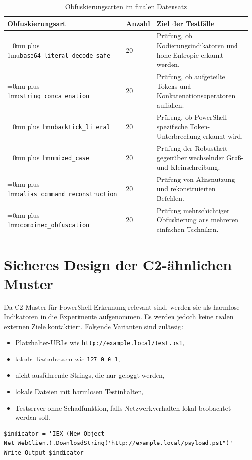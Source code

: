 \documentclass[12pt,a4paper,oneside,parskip=half]{scrreprt}
\newcommand{\codecell}[1]{\begingroup\Urlmuskip=0mu plus 1mu\relax\nolinkurl{#1}\endgroup}
\newcommand{\codebreak}[2]{\codecell{#1#2}}
\begin{document}
\begin{table}[H]
\centering
\caption{Obfuskierungsarten im finalen Datensatz}
\small
\begin{tabularx}{\textwidth}{|L{4cm}|C{1.5cm}|Y|}
\hline
\textbf{Obfuskierungsart} & \textbf{Anzahl} & \textbf{Ziel der Testfälle}\\
\hline
\codebreak{base64\_literal}{\_decode\_safe} & 20 & Prüfung, ob Kodierungsindikatoren und hohe Entropie erkannt werden.\\
\hline
\codebreak{string}{\_concatenation} & 20 & Prüfung, ob aufgeteilte Tokens und Konkatenationsoperatoren auffallen.\\
\hline
\codebreak{backtick}{\_literal} & 20 & Prüfung, ob PowerShell-spezifische Token-Unterbrechung erkannt wird.\\
\hline
\codebreak{mixed}{\_case} & 20 & Prüfung der Robustheit gegenüber wechselnder Groß- und Kleinschreibung.\\
\hline
\codebreak{alias\_command}{\_reconstruction} & 20 & Prüfung von Aliasnutzung und rekonstruierten Befehlen.\\
\hline
\codebreak{combined}{\_obfuscation} & 20 & Prüfung mehrschichtiger Obfuskierung aus mehreren einfachen Techniken.\\
\hline
\end{tabularx}
\end{table}

\section{Sicheres Design der C2-ähnlichen Muster}
Da C2-Muster für PowerShell-Erkennung relevant sind, werden sie als harmlose Indikatoren in die Experimente aufgenommen. Es werden jedoch keine realen externen Ziele kontaktiert. Folgende Varianten sind zulässig:
\begin{itemize}
    \item Platzhalter-URLs wie \texttt{http://example.local/test.ps1},
    \item lokale Testadressen wie \texttt{127.0.0.1},
    \item nicht ausführende Strings, die nur geloggt werden,
    \item lokale Dateien mit harmlosen Testinhalten,
    \item Testserver ohne Schadfunktion, falls Netzwerkverhalten lokal beobachtet werden soll.
\end{itemize}

\begin{lstlisting}[language={},caption={Harmloses Beispiel eines C2-ähnlichen Strings ohne Ausführung}]
$indicator = 'IEX (New-Object Net.WebClient).DownloadString("http://example.local/payload.ps1")'
Write-Output $indicator
\end{lstlisting}
\end{document}
